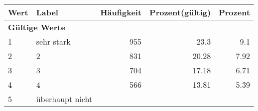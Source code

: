      \begin{longtable}{lXrrr}
     \toprule
     \textbf{Wert} & \textbf{Label} & \textbf{Häufigkeit} & \textbf{Prozent(gültig)} & \textbf{Prozent} \\
     \endhead
     \midrule
     \multicolumn{5}{l}{\textbf{Gültige Werte}}\\

     1 &
     \multicolumn{1}{X}{ sehr stark   } &


       \num{955} &
       \num[round-mode=places,round-precision=2]{23.3} &
         \num[round-mode=places,round-precision=2]{9.1} \\

     2 &
     \multicolumn{1}{X}{ 2   } &


       \num{831} &
       \num[round-mode=places,round-precision=2]{20.28} &
         \num[round-mode=places,round-precision=2]{7.92} \\

     3 &
     \multicolumn{1}{X}{ 3   } &


       \num{704} &
       \num[round-mode=places,round-precision=2]{17.18} &
         \num[round-mode=places,round-precision=2]{6.71} \\

     4 &
     \multicolumn{1}{X}{ 4   } &


       \num{566} &
       \num[round-mode=places,round-precision=2]{13.81} &
         \num[round-mode=places,round-precision=2]{5.39} \\

     5 &
     \multicolumn{1}{X}{ überhaupt nicht   } &



\end{longtable}
